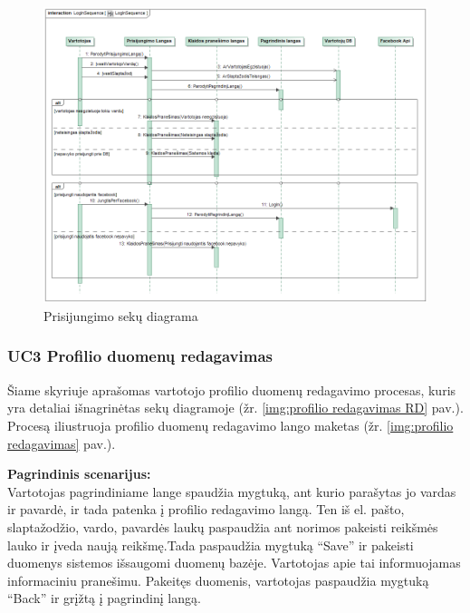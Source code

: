 \documentclass{VUMIFPSkursinis}
\begin{document}
	\begin{figure}[H]
				\centering
				\includegraphics[scale=0.5]{img/LogInSequence}
				\caption{Prisijungimo sekų diagrama}
				\label{img:Prisijungimo sekų diagrama}
			\end{figure}

\subsubsection{UC3 Profilio duomenų redagavimas}
	Šiame skyriuje aprašomas vartotojo profilio duomenų redagavimo procesas,  kuris yra detaliai išnagrinėtas sekų diagramoje (žr. \ref{img:profilio redagavimas RD} pav.). 
	Procesą iliustruoja profilio duomenų redagavimo lango maketas (žr. \ref{img:profilio redagavimas} pav.).

	\textbf{Pagrindinis scenarijus:}\\
	Vartotojas pagrindiniame lange spaudžia mygtuką, ant kurio parašytas jo vardas ir pavardė, ir tada patenka į profilio redagavimo langą. Ten iš el. pašto, slaptažodžio, vardo, pavardės laukų paspaudžia ant norimos pakeisti reikšmės lauko ir įveda naują reikšmę.Tada paspaudžia mygtuką “Save” ir pakeisti duomenys sistemos išsaugomi duomenų bazėje. Vartotojas apie tai informuojamas informaciniu pranešimu. Pakeitęs duomenis, vartotojas paspaudžia mygtuką “Back” ir grįžtą į pagrindinį langą.
\end{document}
